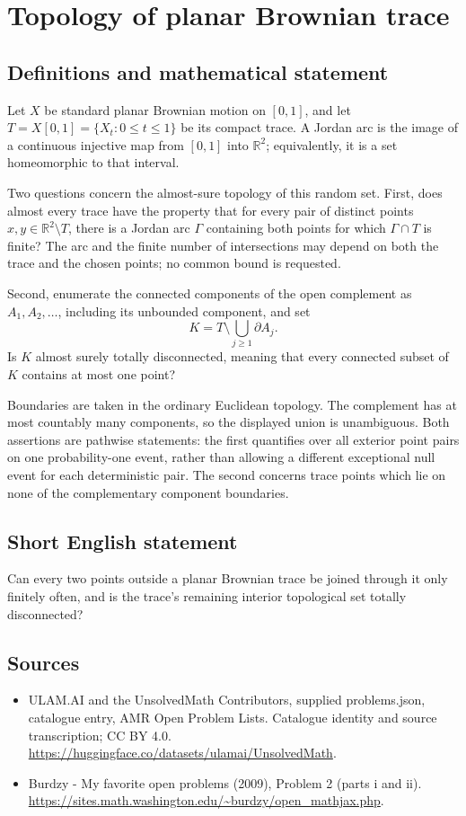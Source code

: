 \documentclass[11pt,a4paper]{article}
\begin{document}
\section*{Topology of planar Brownian trace}\label{statement}

\subsection{Definitions and mathematical statement}
Let $X$ be standard planar Brownian motion on $[0,1]$, and let $T=X[0,1]=\{X_t:0\le t\le1\}$ be its compact trace. A Jordan arc is the image of a continuous injective map from $[0,1]$ into $\mathbb R^2$; equivalently, it is a set homeomorphic to that interval.

Two questions concern the almost-sure topology of this random set. First, does almost every trace have the property that for every pair of distinct points $x,y\in\mathbb R^2\setminus T$, there is a Jordan arc $\Gamma$ containing both points for which $\Gamma\cap T$ is finite? The arc and the finite number of intersections may depend on both the trace and the chosen points; no common bound is requested.

Second, enumerate the connected components of the open complement as $A_1,A_2,\ldots$, including its unbounded component, and set
\[
K=T\setminus\bigcup_{j\ge1}\partial A_j.
\]
Is $K$ almost surely totally disconnected, meaning that every connected subset of $K$ contains at most one point?

Boundaries are taken in the ordinary Euclidean topology. The complement has at most countably many components, so the displayed union is unambiguous. Both assertions are pathwise statements: the first quantifies over all exterior point pairs on one probability-one event, rather than allowing a different exceptional null event for each deterministic pair. The second concerns trace points which lie on none of the complementary component boundaries.
\subsection{Short English statement}
Can every two points outside a planar Brownian trace be joined through it only finitely often, and is the trace’s remaining interior topological set totally disconnected?
\subsection{Sources}
\begin{itemize}
\item[S1] ULAM.AI and the UnsolvedMath Contributors, supplied problems.json, catalogue entry, AMR Open Problem Lists. Catalogue identity and source transcription; CC BY 4.0.
\url{https://huggingface.co/datasets/ulamai/UnsolvedMath}.
\item[S2] Burdzy - My favorite open problems (2009), Problem 2 (parts i and ii). 
\url{https://sites.math.washington.edu/~burdzy/open_mathjax.php}.
\end{itemize}
\end{document}
